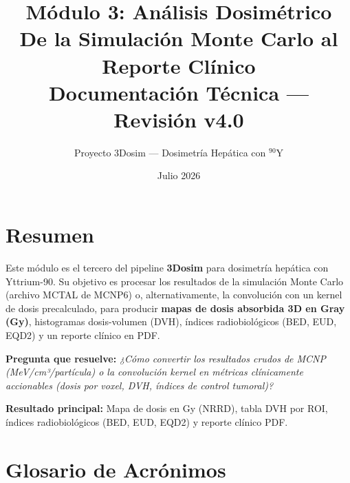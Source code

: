 \documentclass[12pt,a4paper]{article}
\title{\textbf{Módulo 3: Análisis Dosimétrico}\\[0.5cm]
       \large De la Simulación Monte Carlo al Reporte Clínico\\[0.3cm]
       \normalsize Documentación Técnica --- Revisión v4.0}
\author{Proyecto 3Dosim --- Dosimetría Hepática con $^{90}$Y}
\date{Julio 2026}
\begin{document}
\maketitle
\thispagestyle{empty}
\newpage


\section*{Resumen}

Este módulo es el tercero del pipeline \textbf{3Dosim} para dosimetría hepática con Yttrium-90.
Su objetivo es procesar los resultados de la simulación Monte Carlo (archivo MCTAL de MCNP6) o, alternativamente, la convolución con un kernel de dosis precalculado, para producir \textbf{mapas de dosis absorbida 3D en Gray (Gy)}, histogramas dosis-volumen (DVH), índices radiobiológicos (BED, EUD, EQD2) y un reporte clínico en PDF.

\vspace{0.5em}
\noindent
\textbf{Pregunta que resuelve:} \textit{¿Cómo convertir los resultados crudos de MCNP (MeV/cm³/partícula) o la convolución kernel en métricas clínicamente accionables (dosis por voxel, DVH, índices de control tumoral)?}

\vspace{0.3em}
\noindent
\textbf{Resultado principal:} Mapa de dosis en Gy (NRRD), tabla DVH por ROI, índices radiobiológicos (BED, EUD, EQD2) y reporte clínico PDF.


\section*{Glosario de Acrónimos}
\end{document}
